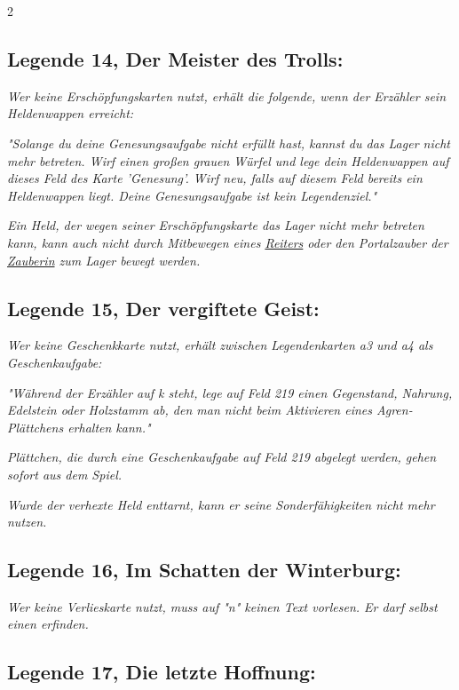 \documentclass[10pt, a4paper, oneside]{book}
\newcommand{\fan}[1]{\textit{#1}}
\begin{document}
\begin{multicols*}{2}
\begin{bgcolor}
\subsection{Legende 14, Der Meister des Trolls:}

\fan{Wer keine Erschöpfungskarten nutzt, erhält die folgende, wenn der Erzähler sein Heldenwappen erreicht:} 

\fan{"Solange du deine Genesungsaufgabe nicht erfüllt hast, kannst du das Lager nicht mehr betreten. Wirf einen großen grauen Würfel und lege dein Heldenwappen auf dieses Feld des Karte 'Genesung'. Wirf neu, falls auf diesem Feld bereits ein Heldenwappen liegt. Deine Genesungsaufgabe ist kein Legendenziel."}

\fan{Ein Held, der wegen seiner Erschöpfungskarte das Lager nicht mehr betreten kann, kann auch nicht durch Mitbewegen eines \hyperref[Reiter]{Reiters} oder den Portalzauber der \hyperref[Zauberin]{Zauberin} zum Lager bewegt werden.}



\subsection{Legende 15, Der vergiftete Geist:}

\fan{Wer keine Geschenkkarte nutzt, erhält zwischen Legendenkarten a3 und a4 als Geschenkaufgabe:}

\fan{"Während der Erzähler auf k steht, lege auf Feld 219 einen Gegenstand, Nahrung, Edelstein oder Holzstamm ab, den man nicht beim Aktivieren eines Agren-Plättchens erhalten kann."}

\fan{Plättchen, die durch eine Geschenkaufgabe auf Feld 219 abgelegt werden, gehen sofort aus dem Spiel.}

\fan{Wurde der verhexte Held enttarnt, kann er seine Sonderfähigkeiten nicht mehr nutzen.}




\subsection{Legende 16, Im Schatten der Winterburg:}

\fan{Wer keine Verlieskarte nutzt, muss auf "n" keinen Text vorlesen. Er darf selbst einen erfinden.}




\subsection{Legende 17, Die letzte Hoffnung:}


\end{bgcolor}
\end{multicols*}
\end{document}
